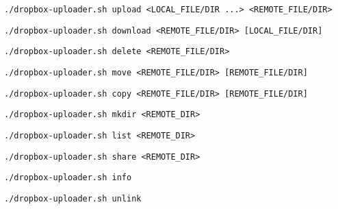 \begin{verbatim}./dropbox-uploader.sh upload <LOCAL_FILE/DIR ...> <REMOTE_FILE/DIR>
\end{verbatim}
\begin{verbatim}./dropbox-uploader.sh download <REMOTE_FILE/DIR> [LOCAL_FILE/DIR]
\end{verbatim}
\begin{verbatim}./dropbox-uploader.sh delete <REMOTE_FILE/DIR>
\end{verbatim}
\begin{verbatim}./dropbox-uploader.sh move <REMOTE_FILE/DIR> [REMOTE_FILE/DIR]
\end{verbatim}
\begin{verbatim}./dropbox-uploader.sh copy <REMOTE_FILE/DIR> [REMOTE_FILE/DIR]
\end{verbatim}
\begin{verbatim}./dropbox-uploader.sh mkdir <REMOTE_DIR> 
\end{verbatim}
\begin{verbatim}./dropbox-uploader.sh list <REMOTE_DIR>
\end{verbatim}
\begin{verbatim}./dropbox-uploader.sh share <REMOTE_DIR>
\end{verbatim}
\begin{verbatim}./dropbox-uploader.sh info
\end{verbatim}
\begin{verbatim}./dropbox-uploader.sh unlink
\end{verbatim}